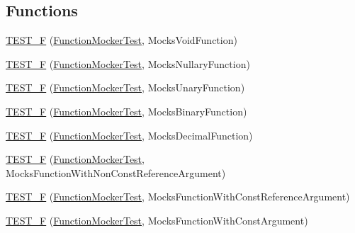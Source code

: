 \subsection*{Functions}
\begin{DoxyCompactItemize}
\item 
\hyperlink{namespacetesting_1_1gmock__generated__function__mockers__test_aee64a5117451830331c321aecd10025f}{T\+E\+S\+T\+\_\+F} (\hyperlink{classtesting_1_1gmock__generated__function__mockers__test_1_1_function_mocker_test}{Function\+Mocker\+Test}, Mocks\+Void\+Function)
\item 
\hyperlink{namespacetesting_1_1gmock__generated__function__mockers__test_a0a1348d6814b9bc02ad5b2ac46361ac0}{T\+E\+S\+T\+\_\+F} (\hyperlink{classtesting_1_1gmock__generated__function__mockers__test_1_1_function_mocker_test}{Function\+Mocker\+Test}, Mocks\+Nullary\+Function)
\item 
\hyperlink{namespacetesting_1_1gmock__generated__function__mockers__test_a835348f70c0335c9213153f72138d12f}{T\+E\+S\+T\+\_\+F} (\hyperlink{classtesting_1_1gmock__generated__function__mockers__test_1_1_function_mocker_test}{Function\+Mocker\+Test}, Mocks\+Unary\+Function)
\item 
\hyperlink{namespacetesting_1_1gmock__generated__function__mockers__test_aa8d2e25f60ad3ac49736ee90fb7ac190}{T\+E\+S\+T\+\_\+F} (\hyperlink{classtesting_1_1gmock__generated__function__mockers__test_1_1_function_mocker_test}{Function\+Mocker\+Test}, Mocks\+Binary\+Function)
\item 
\hyperlink{namespacetesting_1_1gmock__generated__function__mockers__test_a279ba48bf6f937eecfc12530b9dde497}{T\+E\+S\+T\+\_\+F} (\hyperlink{classtesting_1_1gmock__generated__function__mockers__test_1_1_function_mocker_test}{Function\+Mocker\+Test}, Mocks\+Decimal\+Function)
\item 
\hyperlink{namespacetesting_1_1gmock__generated__function__mockers__test_a852587f21316c0341b60b29d44cd61ea}{T\+E\+S\+T\+\_\+F} (\hyperlink{classtesting_1_1gmock__generated__function__mockers__test_1_1_function_mocker_test}{Function\+Mocker\+Test}, Mocks\+Function\+With\+Non\+Const\+Reference\+Argument)
\item 
\hyperlink{namespacetesting_1_1gmock__generated__function__mockers__test_a5367aba117b37aff1ceb4be3d4732559}{T\+E\+S\+T\+\_\+F} (\hyperlink{classtesting_1_1gmock__generated__function__mockers__test_1_1_function_mocker_test}{Function\+Mocker\+Test}, Mocks\+Function\+With\+Const\+Reference\+Argument)
\item 
\hyperlink{namespacetesting_1_1gmock__generated__function__mockers__test_a957ee1afed65097f1c25790f266ec91e}{T\+E\+S\+T\+\_\+F} (\hyperlink{classtesting_1_1gmock__generated__function__mockers__test_1_1_function_mocker_test}{Function\+Mocker\+Test}, Mocks\+Function\+With\+Const\+Argument)

\end{DoxyCompactItemize}
